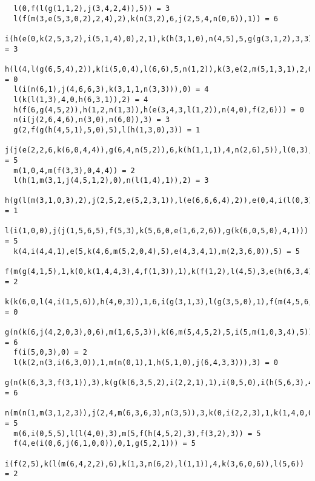 \documentclass{fkssolpub}
\begin{document}
\begin{lstlisting}
  l(0,f(l(g(1,1,2),j(3,4,2,4)),5)) = 3
  l(f(m(3,e(5,3,0,2),2,4),2),k(n(3,2),6,j(2,5,4,n(0,6)),1)) = 6
  i(h(e(0,k(2,5,3,2),i(5,1,4),0),2,1),k(h(3,1,0),n(4,5),5,g(g(3,1,2),3,3)),i(l(3,f(0,6)),n(2,0),1)) = 3
  h(l(4,l(g(6,5,4),2)),k(i(5,0,4),l(6,6),5,n(1,2)),k(3,e(2,m(5,1,3,1),2,0),i(i(3,0,0),5,h(0,2,2)),l(2,j(0,2,4,2)))) = 0
  l(i(n(6,1),j(4,6,6,3),k(3,1,1,n(3,3))),0) = 4
  l(k(l(1,3),4,0,h(6,3,1)),2) = 4
  h(f(6,g(4,5,2)),h(1,2,n(1,3)),h(e(3,4,3,l(1,2)),n(4,0),f(2,6))) = 0
  n(i(j(2,6,4,6),n(3,0),n(6,0)),3) = 3
  g(2,f(g(h(4,5,1),5,0),5),l(h(1,3,0),3)) = 1
  j(j(e(2,2,6,k(6,0,4,4)),g(6,4,n(5,2)),6,k(h(1,1,1),4,n(2,6),5)),l(0,3),e(1,4,f(0,n(4,6)),2),g(i(4,1,k(3,3,0,5)),6,j(1,6,2,0))) = 5
  m(1,0,4,m(f(3,3),0,4,4)) = 2
  l(h(1,m(3,1,j(4,5,1,2),0),n(l(1,4),1)),2) = 3
  h(g(l(m(3,1,0,3),2),j(2,5,2,e(5,2,3,1)),l(e(6,6,6,4),2)),e(0,4,i(l(0,3),0,4),k(1,1,1,1)),j(l(3,0),6,g(m(2,4,3,1),1,2),e(1,4,h(0,4,6),5))) = 1
  l(i(1,0,0),j(j(1,5,6,5),f(5,3),k(5,6,0,e(1,6,2,6)),g(k(6,0,5,0),4,1))) = 5
  k(4,i(4,4,1),e(5,k(4,6,m(5,2,0,4),5),e(4,3,4,1),m(2,3,6,0)),5) = 5
  f(m(g(4,1,5),1,k(0,k(1,4,4,3),4,f(1,3)),1),k(f(1,2),l(4,5),3,e(h(6,3,4),5,f(5,2),3))) = 2
  k(k(6,0,l(4,i(1,5,6)),h(4,0,3)),1,6,i(g(3,1,3),l(g(3,5,0),1),f(m(4,5,6,6),f(6,1)))) = 0
  g(n(k(6,j(4,2,0,3),0,6),m(1,6,5,3)),k(6,m(5,4,5,2),5,i(5,m(1,0,3,4),5)),f(l(1,2),j(3,1,5,3))) = 6
  f(i(5,0,3),0) = 2
  l(k(2,n(3,i(6,3,0)),1,m(n(0,1),1,h(5,1,0),j(6,4,3,3))),3) = 0
  g(n(k(6,3,3,f(3,1)),3),k(g(k(6,3,5,2),i(2,2,1),1),i(0,5,0),i(h(5,6,3),4,4),6),m(e(k(3,3,2,5),3,3,5),j(2,5,5,3),g(5,g(1,5,4),m(1,3,2,3)),3)) = 6
  n(m(n(1,m(3,1,2,3)),j(2,4,m(6,3,6,3),n(3,5)),3,k(0,i(2,2,3),1,k(1,4,0,0))),e(i(3,6,6),i(6,6,l(5,5)),l(m(4,4,4,5),m(2,5,3,2)),0)) = 5
  m(6,i(0,5,5),l(l(4,0),3),m(5,f(h(4,5,2),3),f(3,2),3)) = 5
  f(4,e(i(0,6,j(6,1,0,0)),0,1,g(5,2,1))) = 5
  i(f(2,5),k(l(m(6,4,2,2),6),k(1,3,n(6,2),l(1,1)),4,k(3,6,0,6)),l(5,6)) = 2
\end{lstlisting}
\end{document}

